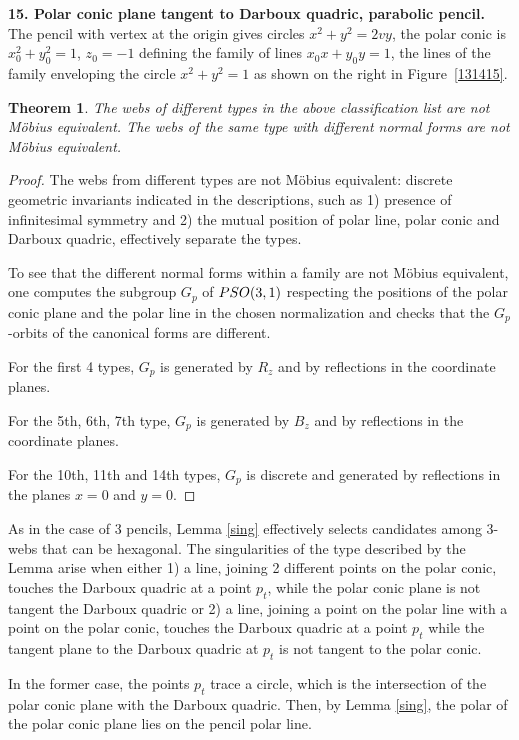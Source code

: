 \documentclass[11pt]{article}
\numberwithin{equation}{section}
\numberwithin{equation}{section}
\newtheorem{Theorem}{Theorem}[section]
\begin{document}
 {\bf 15. Polar conic plane tangent to Darboux quadric, parabolic pencil.}
 The pencil with vertex at the origin gives circles
$
x^2 + y^2=2vy$,
the polar conic is
$
x_0^2 + y_0^2 =1$, $ z_0=-1
$ defining the family of lines $x_0x + y_0y = 1$, the lines of the family enveloping the circle $ x^2 + y^2 = 1$ as shown on the right in Figure~\ref{131415}.

\begin{Theorem}
The webs of different types in the above classification list are not M\"obius equivalent. The webs of the same type with different normal forms are not M\"obius equivalent.
\end{Theorem}
\begin{proof} The webs from different types are not M\"obius equivalent: discrete geometric invariants indicated in the descriptions, such as 1) presence of infinitesimal symmetry and 2) the mutual position of polar line, polar conic and Darboux quadric, effectively separate the types.

To see that the different normal forms within a family are not M\"obius equivalent, one computes the subgroup $G_p$ of ${\rm PSO}(3,1)$ respecting the positions of the polar conic plane and the polar line in the chosen normalization and checks that the $G_p$-orbits of the canonical forms are different.

For the first 4 types, $G_p$ is generated by $R_z$ and by reflections in the coordinate planes.

For the 5th, 6th, 7th type, $G_p$ is generated by $B_z$ and by reflections in the coordinate planes.

For the 10th, 11th and 14th types, $G_p$ is discrete and generated by reflections in the planes $x=0$ and $y=0$.
\end{proof}


As in the case of 3 pencils, Lemma \ref{sing} effectively selects candidates among 3-webs that can be hexagonal. The singularities of the type described by the Lemma arise when either 1) a line, joining 2 different points on the polar conic, touches the Darboux quadric at a point $p_t$, while the polar conic plane is not tangent the Darboux quadric or 2) a line, joining a point on the polar line with a point on the polar conic, touches the Darboux quadric at a point $p_t$ while the tangent plane to the Darboux quadric at $p_t$ is not tangent to the polar conic.

In the former case, the points $p_t$ trace a circle, which is the intersection of the polar conic plane with the Darboux quadric. Then, by Lemma \ref{sing}, the polar of the polar conic plane lies on the pencil polar line.
\end{document}
